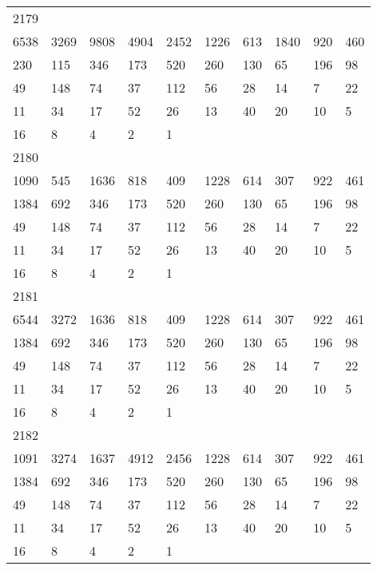 \begin{longtable}{*{10}{l}}
2179&&&&&&&&&\\
6538& 3269& 9808& 4904& 2452& 1226& 613& 1840& 920& 460\\
230& 115& 346& 173& 520& 260& 130& 65& 196& 98\\
49& 148& 74& 37& 112& 56& 28& 14& 7& 22\\
11& 34& 17& 52& 26& 13& 40& 20& 10& 5\\
16& 8& 4& 2& 1& \\

2180&&&&&&&&&\\
1090& 545& 1636& 818& 409& 1228& 614& 307& 922& 461\\
1384& 692& 346& 173& 520& 260& 130& 65& 196& 98\\
49& 148& 74& 37& 112& 56& 28& 14& 7& 22\\
11& 34& 17& 52& 26& 13& 40& 20& 10& 5\\
16& 8& 4& 2& 1& \\

2181&&&&&&&&&\\
6544& 3272& 1636& 818& 409& 1228& 614& 307& 922& 461\\
1384& 692& 346& 173& 520& 260& 130& 65& 196& 98\\
49& 148& 74& 37& 112& 56& 28& 14& 7& 22\\
11& 34& 17& 52& 26& 13& 40& 20& 10& 5\\
16& 8& 4& 2& 1& \\

2182&&&&&&&&&\\
1091& 3274& 1637& 4912& 2456& 1228& 614& 307& 922& 461\\
1384& 692& 346& 173& 520& 260& 130& 65& 196& 98\\
49& 148& 74& 37& 112& 56& 28& 14& 7& 22\\
11& 34& 17& 52& 26& 13& 40& 20& 10& 5\\
16& 8& 4& 2& 1& \\


\end{longtable}
